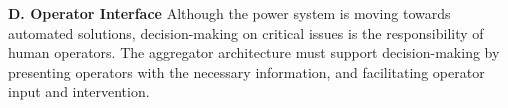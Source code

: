 \textbf{D. Operator Interface}
Although the power system is moving towards automated solutions, decision-making on critical issues is the responsibility of human operators. The aggregator architecture must support decision-making by presenting operators with the necessary information, and facilitating operator input and intervention.  %
